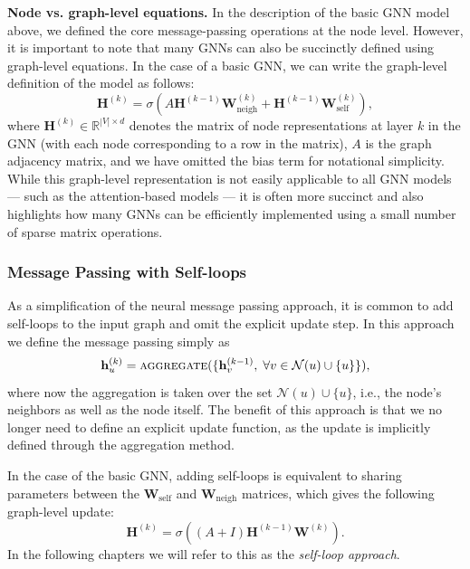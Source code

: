 \documentclass[10pt]{book}
\let\defaultmarginpar\marginpar
\renewcommand\marginpar[2][]{\defaultmarginpar{\itshape\color{gray}#2}}
\begin{document}
\textbf{Node vs. graph-level equations.} In the description of the basic GNN model above, we defined the core message-passing operations at the node level. However, it is important to note that many GNNs can also be succinctly defined using graph-level equations. In the case of a basic GNN, we can write the graph-level definition of the model as follows:
\begin{equation}
    \mathbf H^{(k)} = \sigma \left( A \mathbf H^{(k-1)} \mathbf W_\text{neigh}^{(k)} + \mathbf H^{(k-1)} \mathbf W_\text{self}^{(k)} \right),
\end{equation}
where $\mathbf H^{(k)} \in \mathbb R^{|V| \times d}$ denotes the matrix of node representations at layer $k$ in the GNN (with each node corresponding to a row in the matrix), $A$ is the graph adjacency matrix, and we have omitted the bias term for notational simplicity. While this graph-level representation is not easily applicable to all GNN models --- such as the attention-based models --- it is often more succinct and also highlights how many GNNs can be efficiently implemented using a small number of sparse matrix operations.

\subsubsection{Message Passing with Self-loops}

As a simplification of the neural message passing approach, it is common to add self-loops to the input graph and omit the explicit update step. In this approach we define the message passing simply as
\begin{equation}
    \mathbf h^{(k)}_u = \textsc{aggregate}(\{\mathbf h_v^{(k-1)}, \; \forall v \in \mathcal N(u) \cup \{u\}\}),
\end{equation}
where now the aggregation is taken over the set $\mathcal N(u) \cup \{u\}$, i.e., the node’s neighbors as well as the node itself. The benefit of this approach is that we no longer need to define an explicit update function, as the update is implicitly defined through the aggregation method.

In the case of the basic GNN, adding self-loops is equivalent to  sharing parameters between the $\mathbf W_\text{self}$ and $\mathbf W_\text{neigh}$ matrices, which gives the following graph-level update:
\begin{equation}
    \mathbf H^{(k)} = \sigma \left( (A + I) \mathbf H^{(k-1)} \mathbf W^{(k)} \right) .
\end{equation}
In the following chapters we will refer to this as the \emph{self-loop approach}\marginpar{self-loop approach}.
\end{document}
